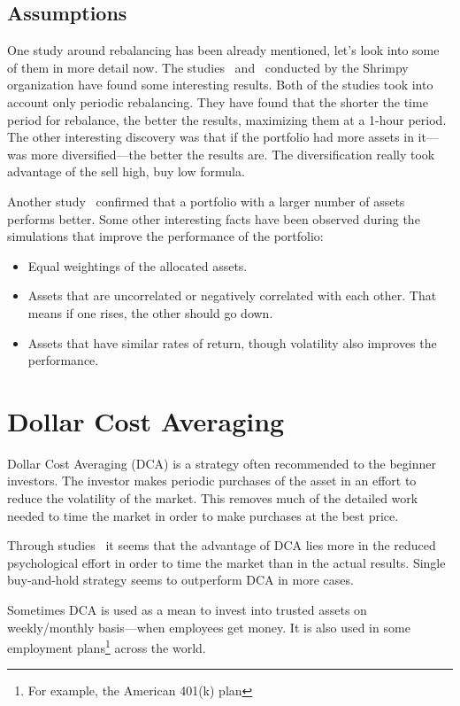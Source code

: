\subsection*{Assumptions}
\label{rebalance-assumptions}
One study around rebalancing has been already mentioned, let's look into some of them in more detail now. The studies~\cite{portfolio-diversity} and~\cite{diversify-perform-better} conducted by the Shrimpy organization have found some interesting results. Both of the studies took into account only periodic rebalancing. They have found that the shorter the time period for rebalance, the better the results, maximizing them at a 1-hour period. The other interesting discovery was that if the portfolio had more assets in it---was more diversified---the better the results are. The diversification really took advantage of the sell high, buy low formula.

Another study~\cite{rebalancing-strategy} confirmed that a portfolio with a larger number of assets performs better. Some other interesting facts have been observed during the simulations that improve the performance of the portfolio:
\begin{itemize}
    \item Equal weightings of the allocated assets.
    \item Assets that are uncorrelated or negatively correlated with each other. That means if one rises, the other should go down.
    \item Assets that have similar rates of return, though volatility also improves the performance.
\end{itemize}

\section{Dollar Cost Averaging}
\label{section-dca}
Dollar Cost Averaging (DCA) is a strategy often recommended to the beginner investors. The investor makes periodic purchases of the asset in an effort to reduce the volatility of the market. This removes much of the detailed work needed to time the market in order to make purchases at the best price.

Through studies~\cite{DCA-study} it seems that the advantage of DCA lies more in the reduced psychological effort in order to time the market than in the actual results. Single buy-and-hold strategy seems to outperform DCA in more cases.

Sometimes DCA is used as a mean to invest into trusted assets on weekly/monthly basis---when employees get money. It is also used in some employment plans\footnote{For example, the American 401(k) plan} across the world.

